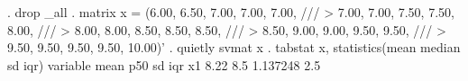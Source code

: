 . drop _all
{\smallskip}
. matrix x = (6.00, 6.50, 7.00, 7.00, 7.00,    ///
>             7.00, 7.00, 7.50, 7.50, 8.00,    ///
>             8.00, 8.00, 8.50, 8.50, 8.50,    ///
>             8.50, 9.00, 9.00, 9.50, 9.50,    ///
>             9.50, 9.50, 9.50, 9.50, 10.00)'
{\smallskip}
. quietly svmat x
{\smallskip}
. tabstat x, statistics(mean median sd iqr)
{\smallskip}
    variable {\VBAR}      mean       p50        sd       iqr
          x1 {\VBAR}      8.22       8.5  1.137248       2.5
{\smallskip}

